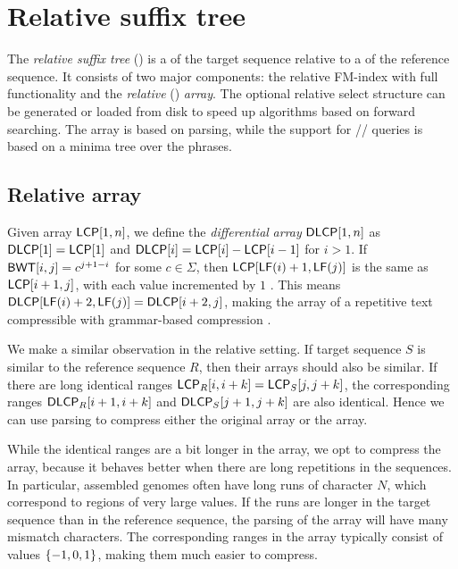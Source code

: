 \section{Relative suffix tree}

The \emph{relative suffix tree} (\RST) is a \CSTnpr{} of the
target sequence relative to a \CST{} of the reference sequence. It consists of
two major components: the relative FM-index with full functionality and the
\emph{relative} \LCP{} (\RLCP) \emph{array}. The optional relative select
structure can be generated or loaded from disk to speed up algorithms based on
forward searching. The \RLCP{} array is based on \RLZ{} parsing, while the
support for \nsv/\psv/\rmq{} queries is based on a minima tree over the
phrases.

\subsection{Relative \LCP{} array}

Given \LCP{} array $\mathsf{LCP}[1,n]$, we define the \emph{differential} \LCP{}
\emph{array} $\mathsf{DLCP}[1,n]$ as $\mathsf{DLCP}[1] = \mathsf{LCP}[1]$ and $\mathsf{DLCP}[i] = \mathsf{LCP}[i]
- \mathsf{LCP}[i-1]$ for $i > 1$. If $\mathsf{BWT}[i,j] = c^{j+1-i}$ for some $c \in
\Sigma$, then $\mathsf{LCP}[\mathsf{LF}(i)+1,\mathsf{LF}(j)]$ is the same as $\mathsf{LCP}[i+1,j]$, with
each value incremented by $1$ \cite{Fischer2009a}. This means
$\mathsf{DLCP}[\mathsf{LF}(i)+2,\mathsf{LF}(j)] = \mathsf{DLCP}[i+2,j]$, making the \DLCP{} array of a
repetitive text compressible with grammar-based compression
\cite{Abeliuk2013}.

We make a similar observation in the relative setting. If target sequence $S$
is similar to the reference sequence $R$, then their \LCP{} arrays should also
be similar. If there are long identical ranges $\mathsf{LCP}_{R}[i,i+k] =
\mathsf{LCP}_{S}[j,j+k]$, the corresponding \DLCP{} ranges $\mathsf{DLCP}_{R}[i+1,i+k]$ and
$\mathsf{DLCP}_{S}[j+1,j+k]$ are also identical. Hence we can use \RLZ{} parsing to
compress either the original \LCP{} array or the \DLCP{} array.

While the identical ranges are a bit longer in the \LCP{} array, we opt to
compress the \DLCP{} array, because it behaves better when there are long
repetitions in the sequences. In particular, assembled genomes often have long
runs of character $N$, which correspond to regions of very large \LCP{}
values. If the runs are longer in the target sequence than in the reference
sequence, the \RLZ{} parsing of the \LCP{} array will have many
mismatch characters. The corresponding ranges in the
\DLCP{} array typically consist of values $\{ -1, 0, 1 \}$, making them much
easier to compress.


